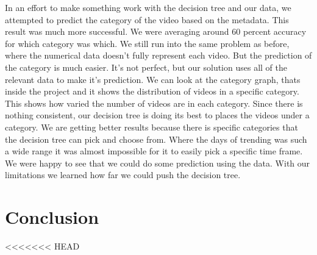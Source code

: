 \documentclass{article}
\begin{document}
\par
    In an effort to make something work with the decision tree and our data, we attempted to predict the category of the video based on the metadata. 
This result was much more successful. We were averaging around 60 percent accuracy for which category was which. 
We still run into the same problem as before, where the numerical data doesn't fully represent each video.
But the prediction of the category is much easier.
It's not perfect, but our solution uses all of the relevant data to make it's prediction.
We can look at the category graph, thats inside the project and it shows the distribution of videos in a specific category. 
This shows how varied the number of videos are in each category. 
Since there is nothing consistent, our decision tree is doing its best to places the videos under a category.
We are getting better results because there is specific categories that the decision tree can pick and choose from.
Where the days of trending was such a wide range it was almost impossible for it to easily pick a specific time frame.
We were happy to see that we could do some prediction using the data. 
With our limitations we learned how far we could push the decision tree.

\section*{Conclusion}
<<<<<<< HEAD
\end{document}
